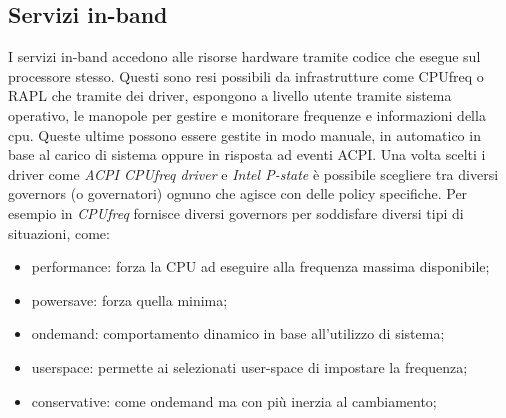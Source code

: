 
\subsection{Servizi in-band} %

I servizi in-band accedono alle risorse hardware tramite codice che esegue sul processore stesso. Questi sono resi possibili da infrastrutture come CPUfreq o RAPL che tramite dei driver, espongono a livello utente tramite  sistema operativo, le manopole per gestire e monitorare frequenze e informazioni della cpu. Queste ultime possono essere gestite in modo manuale, in automatico in base al carico di sistema oppure in risposta ad eventi ACPI. Una volta scelti i driver come \emph{ACPI CPUfreq driver} e \emph{Intel P-state} è possibile scegliere tra diversi governors (o governatori) ognuno che agisce con delle policy specifiche.
Per esempio in \emph{CPUfreq} fornisce diversi governors per soddisfare diversi tipi di situazioni, come:
\begin{itemize}
    \item performance: forza la CPU ad eseguire alla frequenza massima disponibile;
    \item powersave: forza quella minima;
    \item ondemand: comportamento dinamico in base all'utilizzo di sistema;
    \item userspace: permette ai selezionati user-space di impostare la frequenza; 
    \item conservative: come ondemand ma con più inerzia al cambiamento;
\end{itemize}

